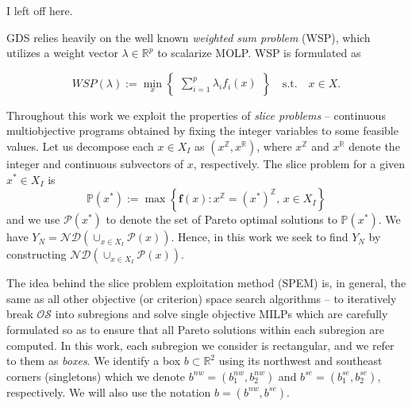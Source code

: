 \documentclass[12pt]{article}
\newcommand{\su}[2][1]{\ensuremath{\displaystyle{\sum_{#1}^{#2}}}}
\newcommand{\R}{\mathbb{R}}
\newcommand{\Z}{\mathbb{Z}}
\renewcommand{\P}{\mathbb{P}}
\newcommand{\OS}{\mathcal{OS}}
\newcommand{\objf}{\boldsymbol{f}}
\newcommand{\nd}[1]{\mathcal{ND}(#1)}
\begin{document}
{\color{red} I left off here. }

GDS relies heavily on the well known \emph{weighted sum problem} (WSP), which utilizes a weight vector $\lambda \in \R^p$ to scalarize MOLP. WSP is formulated as

\begin{equation}\label{WSP}
WSP(\lambda) := \min_{x} \left\{\begin{array}{c} \su[i=1]{p} \lambda_i f_i(x) \end{array}\right\} \quad \text{s.t.} \quad  x \in X.
\end{equation}



Throughout this work we exploit the properties of \emph{slice problems} -- continuous multiobjective programs obtained by fixing the integer variables to some feasible values. Let us decompose each $x \in X_I$ as $(x^\Z,x^\R)$, where $x^\Z$ and $x^\R$ denote the integer and continuous subvectors of $x$, respectively. The slice problem for a given $x^* \in X_I$ is \[\P(x^*) := \max\left\{\objf(x): x^\Z = (x^{*})^\Z,\, x \in X_I \right\}\]
and we use $\mathcal{P}(x^*)$ to denote the set of Pareto optimal solutions to $\P(x^*)$. We have $Y_N = \nd{\cup_{x\in X_I} \mathcal{P}(x)}$. Hence, in this work we seek to find $Y_N$ by constructing $\nd{\cup_{x\in X_I} \mathcal{P}(x)}$.

The idea behind the slice problem exploitation method (SPEM) is, in general, the same as all other objective (or criterion) space search algorithms -- to iteratively break $\OS$ into subregions and solve single objective MILPs which are carefully formulated so as to ensure that all Pareto solutions within each subregion are computed. In this work, each subregion we consider is rectangular, and we refer to them as \emph{boxes}. We identify a box $b \subset \R^2$ using its northwest and southeast corners (singletons) which we denote $b^{nw} = (b^{nw}_1,b^{nw}_2)$ and $b^{se}= (b^{se}_1,b^{se}_2)$, respectively. We will also use the notation $b = (b^{nw},b^{se})$.
\end{document}
